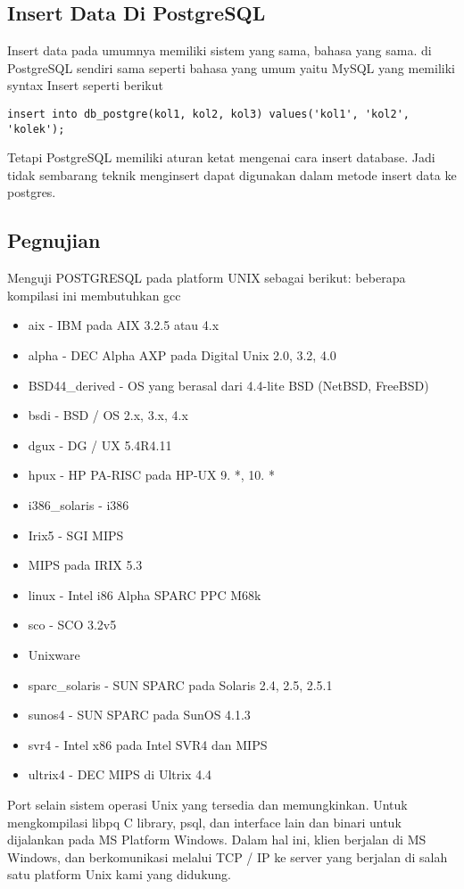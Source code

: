 \subsection{Insert Data Di PostgreSQL}
Insert data pada umumnya memiliki sistem yang sama, bahasa yang sama. di PostgreSQL sendiri sama seperti bahasa yang umum yaitu MySQL yang memiliki syntax Insert seperti berikut
\begin{verbatim}
insert into db_postgre(kol1, kol2, kol3) values('kol1', 'kol2', 'kolek');
\end{verbatim}
Tetapi PostgreSQL memiliki aturan ketat mengenai cara insert database. Jadi tidak sembarang teknik menginsert dapat digunakan dalam metode insert data ke postgres.

\subsection{Pegnujian}
Menguji POSTGRESQL pada platform UNIX sebagai berikut: 
beberapa kompilasi ini membutuhkan gcc
\begin {itemize} 
	\item aix - IBM pada AIX 3.2.5 atau 4.x
	\item alpha - DEC Alpha AXP pada Digital Unix 2.0, 3.2, 4.0
	\item BSD44_derived - OS yang berasal dari 4.4-lite BSD (NetBSD, FreeBSD)
	\item bsdi - BSD / OS 2.x, 3.x, 4.x
	\item dgux - DG / UX 5.4R4.11
	\item hpux - HP PA-RISC pada HP-UX 9. *, 10. *
	\item i386_solaris - i386
	\item Irix5 - SGI MIPS
	\item MIPS pada IRIX 5.3
	\item linux - Intel i86 Alpha SPARC PPC M68k
	\item sco - SCO 3.2v5
	\item Unixware
	\item sparc_solaris - SUN SPARC pada Solaris 2.4, 2.5, 2.5.1
	\item sunos4 - SUN SPARC pada SunOS 4.1.3
	\item svr4 - Intel x86 pada Intel SVR4 dan MIPS
	\item ultrix4 - DEC MIPS di Ultrix 4.4
\end {itemize}

Port selain sistem operasi Unix yang tersedia dan memungkinkan. 
Untuk mengkompilasi libpq C library, psql, dan interface lain dan binari untuk dijalankan pada MS Platform Windows. Dalam hal ini, klien berjalan di MS Windows, dan berkomunikasi melalui TCP / IP ke server yang berjalan di salah satu platform Unix kami yang didukung.
